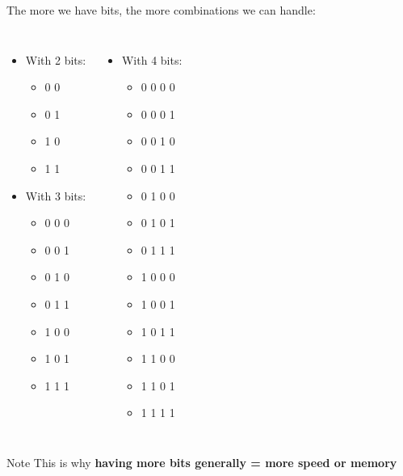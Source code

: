 \documentclass{beamer}[10pt, usepdftitle=false, handout]
\begin{document}
	\begin{frame}
		
	The more we have bits, the more combinations we can handle:
	\vspace*{1em}
	\begin{columns}[c]
	\begin{itemize}
	\item{With 2 bits:
		\begin{itemize}
			\item{0 0}
			\item{0 1}
			\item{1 0}
			\item{1 1}
		\end{itemize}
	}
	\item{With 3 bits:
		\begin{itemize}
		\item{0 0 0}
		\item{0 0 1}
		\item{0 1 0}
		\item{0 1 1}
		\item{1 0 0}
		\item{1 0 1}
		\item{1 1 1}	
		\end{itemize}
	}	
	\end{itemize}
	
	\begin{itemize}
	\item{With 4 bits:
	\begin{itemize}
	\item{0 0 0 0}
	\item{0 0 0 1}
	\item{0 0 1 0}
	\item{0 0 1 1}
	\item{0 1 0 0}
	\item{0 1 0 1}
	\item{0 1 1 1}
	\item{1 0 0 0}
	\item{1 0 0 1}
	\item{1 0 1 1}
	\item{1 1 0 0}
	\item{1 1 0 1}
	\item{1 1 1 1}	
	
	\end{itemize}		
	}
	\end{itemize}
	\end{columns}
	
	\begin{block}{Note}
	This is why \textbf{having more bits generally = more speed or memory}
	\end{block}			
	
	\end{frame}	
	
\end{document}
